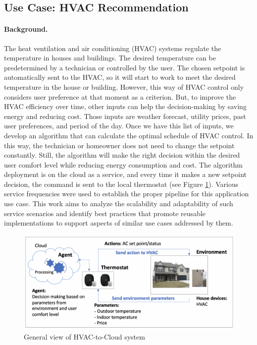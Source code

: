 \subsection{Use Case: HVAC Recommendation}


\paragraph*{Background.}
The heat ventilation and air conditioning (HVAC) systems regulate the temperature in houses and buildings. 
The desired temperature can be predetermined by a technician or controlled by the user. The chosen setpoint 
is automatically sent to the HVAC, so it will start to work to meet the desired temperature in the house or 
building. However, this way of HVAC control only considers user preference at that moment as a criterion. But, to improve the HVAC efficiency over time, other inputs can help the decision-making by saving energy and reducing cost. Those inputs are weather forecast, utility prices, past user preferences, and period of the day. Once we have this list of inputs, we develop an algorithm that can calculate the optimal schedule of HVAC control. In this way, the technician or homeowner does not need to change the setpoint constantly. Still, the algorithm will make the right decision within the desired user comfort level while reducing energy consumption and cost. The algorithm deployment is on the cloud as a service, and every time it makes a new 
setpoint decision, the command is sent to the local thermostat (see Figure \ref{fig:hvac_general}). Various service 
frequencies were used to establish the proper pipeline for this application use case. This work aims to analyze the scalability and adaptability of such service scenarios and identify best practices that promote reusable implementations to support aspects of similar use cases addressed by them.

\begin{figure}[htb]
\centering\includegraphics[width=1.0\columnwidth]{usecase/hvac_general.png}
\caption{General view of HVAC-to-Cloud system \cite{kotevska2020rl}}
\label{fig:hvac_general}
\end{figure}

